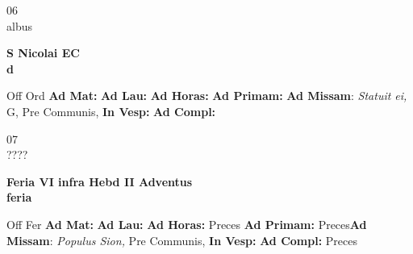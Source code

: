 \documentclass[10pt, openany]{book}
\begin{document}
    \begin{center}
        \begin{minipage}{3.5in}
            \vspace{2em}
            \begin{minipage}{0.5in}
                {\Huge 06} \\
                {\normalsize albus}
            \end{minipage}
            \begin{minipage}{3.0in}
                \textbf{ \large S Nicolai EC \\
                \textnormal{\normalsize d}}

            \end{minipage}
            \begin{justify}Off Ord
                \textbf{Ad Mat: }
                \textbf{Ad Lau: }
                \textbf{Ad Horas: }
                \textbf{Ad Primam: }\textbf{Ad Missam}: \textit{Statuit ei,} G, Pre Communis, 
                \textbf{In Vesp: }
                \textbf{Ad Compl: }
            \end{justify}
        \end{minipage}
    \end{center}

    \begin{center}
        \begin{minipage}{3.5in}
            \vspace{2em}
            \begin{minipage}{0.5in}
                {\Huge 07} \\
                {\normalsize ????}
            \end{minipage}
            \begin{minipage}{3.0in}
                \textbf{ \large Feria VI infra Hebd II Adventus \\
                \textnormal{\normalsize feria}}

            \end{minipage}
            \begin{justify}Off Fer
                \textbf{Ad Mat: }
                \textbf{Ad Lau: }
                \textbf{Ad Horas: }Preces
                \textbf{Ad Primam: }Preces\textbf{Ad Missam}: \textit{Populus Sion,} Pre Communis, 
                \textbf{In Vesp: }
                \textbf{Ad Compl: }Preces
            \end{justify}
        \end{minipage}
    \end{center}
\end{document}
